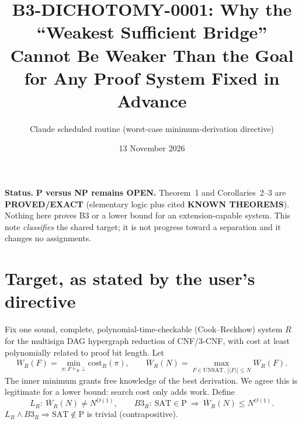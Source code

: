 \documentclass[11pt]{article}
\title{B3-DICHOTOMY-0001: Why the ``Weakest Sufficient Bridge'' Cannot Be Weaker Than the Goal\\
for Any Proof System Fixed in Advance}
\author{Claude scheduled routine (worst-case minimum-derivation directive)}
\date{13 November 2026}
\newcommand{\Wb}{\overline W}
\newcommand{\SAT}{\mathrm{SAT}}
\begin{document}
\maketitle

\noindent\textbf{Status.} \textbf{P versus NP remains OPEN.} Theorem~1 and
Corollaries~2--3 are \textbf{PROVED/EXACT} (elementary logic plus cited
\textbf{KNOWN THEOREMS}). Nothing here proves B3 or a lower bound for an
extension-capable system. This note \emph{classifies} the shared target; it is
not progress toward a separation and it changes no assignments.

\section{Target, as stated by the user's directive}
Fix one sound, complete, polynomial-time-checkable (Cook--Reckhow) system $R$ for
the multisign DAG hypergraph reduction of CNF/3-CNF, with cost at least
polynomially related to proof bit length. Let
\[
W_R(F)=\min_{\pi:F\vdash_R\bot}\mathrm{cost}_R(\pi),\qquad
\Wb_R(N)=\max_{F\in\mathrm{UNSAT},\ |\langle F\rangle|\le N}W_R(F).
\]
The inner minimum grants free knowledge of the best derivation. We agree this
is legitimate for a lower bound: search cost only adds work. Define
\[
L_R:\ \Wb_R(N)\neq N^{O(1)},\qquad
B3_R:\ \SAT\in\mathrm P\ \Longrightarrow\ \Wb_R(N)\le N^{O(1)}.
\]
$L_R\wedge B3_R\Rightarrow \SAT\notin\mathrm P$ is trivial (contrapositive).
\end{document}

